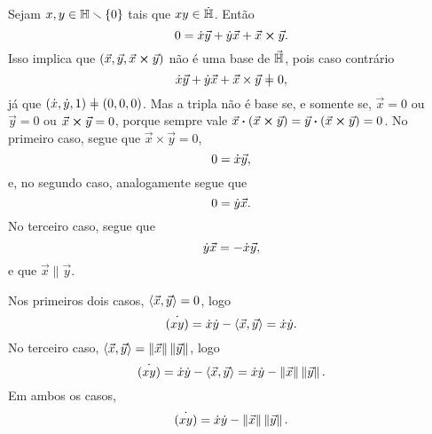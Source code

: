 Sejam $x,y \in \mathbb{H} \smallsetminus \{0\}$ tais que $xy \in \dot{\mathbb{H}}$. Então
	\begin{equation*}
	0 = \dot{x}\vec{y}+\dot{y}\vec{x}+{\vec{x}} \bm{\times} {\vec{y}}.
	\end{equation*}
%
%
Isso implica que $(\vec{x},\vec{y},{\vec{x}} \bm{\times} {\vec{y}})$ não é uma base de $\vec{\mathbb{H}}$, pois caso contrário
	\begin{equation*}
	\esc{x}\vec{y}+\esc{y}\vec{x}+\vec{x} \times \vec{y} \neq 0,
	\end{equation*}
já que $(\esc{x},\esc{y},1) \neq (0,0,0)$. Mas a tripla não é base se, e somente se, $\vec{x}=0$ ou $\vec{y}=0$ ou ${\vec{x}} \bm{\times} {\vec{y}}=0$, porque sempre vale ${\vec{x}} \bm{\cdot} {({\vec{x}} \bm{\times} {\vec{y}})} = {\vec{y}} \bm{\cdot} {({\vec{x}} \bm{\times} {\vec{y}})}=0$. No primeiro caso, segue que $\vec{x} \times \vec{y}=0$,
	\begin{equation*}
	0=\dot{x}\vec{y},
	\end{equation*}
e, no segundo caso, analogamente segue que
	\begin{equation*}
	0=\dot{y}\vec{x}.
	\end{equation*}
No terceiro caso, segue que
	\begin{equation*}
	\dot{y}\vec{x} = -\dot{x}\vec{y},
	\end{equation*}
e que $\vec{x} \parallel \vec{y}$.

Nos primeiros dois casos, $\left\langle{\vec{x}},{\vec{y}}\right\rangle=0$, logo
	\begin{equation*}
	\dot{(xy)} = \dot{x}\dot{y} - \left\langle{\vec{x}},{\vec{y}}\right\rangle = \dot{x}\dot{y}.
	\end{equation*}
No terceiro caso, $\left\langle{\vec{x}},{\vec{y}}\right\rangle=\left\Vert{\vec{x}}\right\Vert\left\Vert{\vec{y}}\right\Vert$, logo
	\begin{equation*}
	\dot{(xy)} = \dot{x}\dot{y} - \left\langle{\vec{x}},{\vec{y}}\right\rangle = \dot{x}\dot{y} - \left\Vert{\vec{x}}\right\Vert\left\Vert{\vec{y}}\right\Vert.
	\end{equation*}
Em ambos os casos,
	\begin{equation*}
	\dot{(xy)} = \dot{x}\dot{y} - \left\Vert{\vec{x}}\right\Vert\left\Vert{\vec{y}}\right\Vert.
	\end{equation*}





